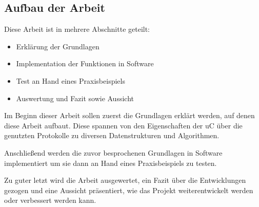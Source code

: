 \subsection{Aufbau der Arbeit}

Diese Arbeit ist in mehrere Abschnitte geteilt:

\begin{itemize}
    \item Erklärung der Grundlagen
    \item Implementation der Funktionen in Software
    \item Test an Hand eines Praxisbeispiels
    \item Auswertung und Fazit sowie Aussicht
\end{itemize}

Im Beginn dieser Arbeit sollen zuerst die Grundlagen erklärt werden, auf denen diese Arbeit aufbaut. Diese spannen von den Eigenschaften
der \ac{uC} über die genutzten Protokolle zu diversen Datenstrukturen und Algorithmen.

Anschließend werden die zuvor besprochenen Grundlagen in Software implementiert um sie dann an Hand eines Praxisbeispiels zu testen.

Zu guter letzt wird die Arbeit ausgewertet, ein Fazit über die Entwicklungen gezogen und eine Aussicht präsentiert, wie das Projekt
weiterentwickelt werden oder verbessert werden kann. 